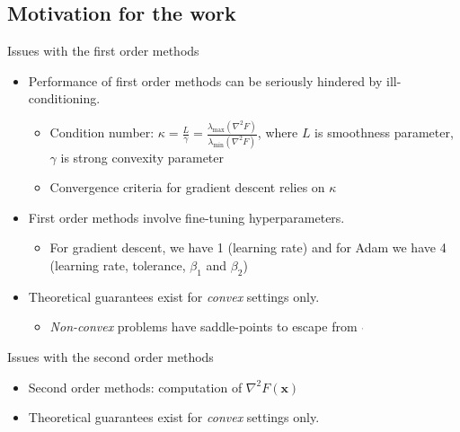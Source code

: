 \documentclass[10pt]{beamer}
\newcommand{\h}{\nabla^{2}}
\newcommand{\xbold}{\mathbf{x}}
\newcommand{\mineig}{\lambda_{\min}}
\newcommand{\maxeig}{\lambda_{\max}}
\newcommand{\citecomma}{\({}^{{}_{,}}\)}
\begin{document}
\subsection{Motivation for the work}
\begin{frame}{Issues with the first order methods}
  \begin{itemize}
  \item<1->{
    Performance of first order methods can be seriously hindered by ill-conditioning.
    \begin{itemize}    
        \item<2->{Condition number: \(\kappa = \frac{L}{\gamma} = \frac{\maxeig(\h F)}{\mineig(\h F)}\), where \(L\) is smoothness parameter, \(\gamma\) is strong convexity parameter}
        \item<3->{Convergence criteria for gradient descent relies on \(\kappa\) }
    \end{itemize}
  }
  \item<4->{
    First order methods involve fine-tuning hyperparameters.
    \begin{itemize}    
        \item<5->{For gradient descent, we have 1 (learning rate) and for Adam  we have 4 (learning rate, tolerance, \(\beta_{1}\) and \(\beta_{2}\))}
    \end{itemize}
  }
  \item<6->{
    Theoretical guarantees exist for \emph{convex} settings only.
    \begin{itemize}    
        \item<7->{\emph{Non-convex} problems have saddle-points to escape from \citecomma{}}
    \end{itemize}
  }
  \end{itemize}
\end{frame}

\begin{frame}{Issues with the second order methods}
  \begin{itemize}
  \item<1-> {
    Second order methods: computation of \(\h F(\xbold)\)
    \begin{itemize}
    \end{itemize}
  }
  \item<4->{
    Theoretical guarantees exist for \emph{convex} settings only.
  }
  \end{itemize}
\end{frame}
\end{document}
